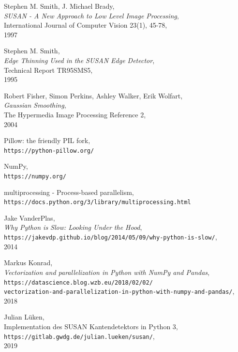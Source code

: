 \documentclass[a4paper, 11pt]{report}
\theoremstyle{definition}
\begin{document}
\begin{thebibliography}{56}

	Stephen M. Smith, J. Michael Brady,\\
	\textit{SUSAN - A New Approach to Low Level Image Processing},\\
	International Journal of Computer Vision 23(1), 45-78,\\
	1997

	Stephen M. Smith,\\
	\textit{Edge Thinning Used in the SUSAN Edge Detector},\\
	Technical Report TR95SMS5,\\
	1995

	Robert Fisher, Simon Perkins, Ashley Walker, Erik Wolfart,\\
	\textit{Gaussian Smoothing},\\
	The Hypermedia Image Processing Reference 2,\\
	2004
	
	Pillow: the friendly PIL fork, \\
	\texttt{https://python-pillow.org/}

	NumPy,\\
	\texttt{https://numpy.org/}

	multiprocessing - Process-based parallelism, \\
	\texttt{https://docs.python.org/3/library/multiprocessing.html}

	Jake VanderPlas,\\
	\textit{Why Python is Slow: Looking Under the Hood},\\
	\texttt{https://jakevdp.github.io/blog/2014/05/09/why-python-is-slow/},\\
	2014

	Markus Konrad,\\
	\textit{Vectorization and parallelization in Python with NumPy and Pandas},\\
	\texttt{https://datascience.blog.wzb.eu/2018/02/02/\\
	vectorization-and-parallelization-in-python-with-numpy-and-pandas/},\\
	2018

	Julian Lüken,\\
	Implementation des SUSAN Kantendetektors in Python 3,\\
	\texttt{https://gitlab.gwdg.de/julian.lueken/susan/},\\
	2019

\end{thebibliography}
			


%
\end{document}
